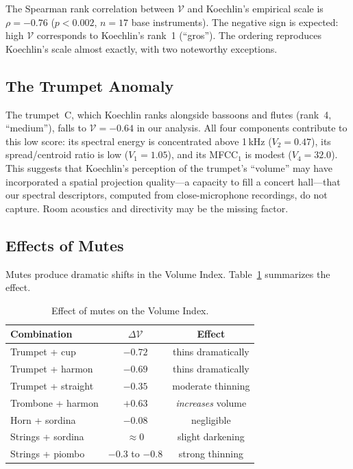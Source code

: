 \documentclass[journal]{IEEEtran}
\begin{document}
The Spearman rank correlation between $\mathcal{V}$ and Koechlin's empirical scale is $\rho = -0.76$ ($p < 0.002$, $n = 17$ base instruments). The negative sign is expected: high $\mathcal{V}$ corresponds to Koechlin's rank~1 (``gros''). The ordering reproduces Koechlin's scale almost exactly, with two noteworthy exceptions.

\subsection{The Trumpet Anomaly}

The trumpet~C, which Koechlin ranks alongside bassoons and flutes (rank~4, ``medium''), falls to $\mathcal{V} = -0.64$ in our analysis. All four components contribute to this low score: its spectral energy is concentrated above 1\,kHz ($V_2 = 0.47$), its spread/centroid ratio is low ($V_1 = 1.05$), and its MFCC$_1$ is modest ($V_4 = 32.0$). This suggests that Koechlin's perception of the trumpet's ``volume'' may have incorporated a spatial projection quality---a capacity to fill a concert hall---that our spectral descriptors, computed from close-microphone recordings, do not capture. Room acoustics and directivity may be the missing factor.

\subsection{Effects of Mutes}

Mutes produce dramatic shifts in the Volume Index. Table~\ref{tab:mutes} summarizes the effect.

\begin{table}[!t]
\centering
\caption{Effect of mutes on the Volume Index.}
\label{tab:mutes}
\small
\begin{tabular}{@{}lcc@{}}
\toprule
\textbf{Combination} & $\Delta\mathcal{V}$ & \textbf{Effect} \\
\midrule
Trumpet + cup        & $-0.72$ & thins dramatically \\
Trumpet + harmon     & $-0.69$ & thins dramatically \\
Trumpet + straight   & $-0.35$ & moderate thinning \\
Trombone + harmon    & $+0.63$ & \textit{increases} volume \\
Horn + sordina       & $-0.08$ & negligible \\
Strings + sordina    & $\approx 0$ & slight darkening \\
Strings + piombo     & $-0.3$ to $-0.8$ & strong thinning \\
\bottomrule
\end{tabular}
\end{table}
\end{document}
